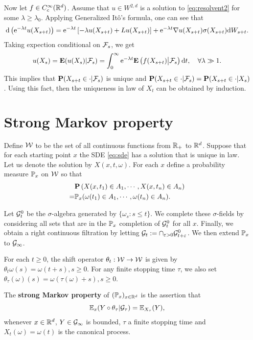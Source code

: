 	Now let $f\in C_c^\infty({\mathbb R}^d)$. Assume that $u\in W^{2,d}$ is a solution to \eqref{eq:resolvent2} for some $\lambda\geq \lambda_0$.  Applying Generalized It\^o's formula, one can see that 
	\begin{align*}
		\text{\rm{d}} \left(\mathrm{e}^{-\lambda t} u(X_{s+t}) \right)=  \mathrm{e}^{-\lambda t} \left[-\lambda u(X_{s+t}) + Lu(X_{s+t})\right] + \mathrm{e}^{-\lambda t} \nabla u(X_{s+t}) \sigma (X_{s+t})\text{\rm{d}} W_{s+t}. 
	\end{align*}
	Taking expection conditional on ${\mathcal F}_s$, we get 
	\[
	    u(X_s) ={\mathbf E}(u(X_s)| {\mathcal F}_s)=  \int_0^\infty \mathrm{e}^{-\lambda t}{\mathbf E} \left(  f(X_{s+t})   \big | {\mathcal F}_s \right) \text{\rm{d}} t,\quad \forall \lambda \gg 1. 
	\]
    This implies that ${\mathbf P} (X_{s+t}\in \cdot| {\mathcal F}_s)$ is unique and ${\mathbf P} (X_{s+t}\in \cdot| {\mathcal F}_s)={\mathbf P} (X_{s+t}\in \cdot| X_s)$. Using this fact, then the uniqueness in law of $X_t$ can be obtained by induction. 

\section{Strong Markov property}
Define ${\mathcal W}$ to be the set of all continuous functions from ${\mathbb R}_+$ to ${\mathbb R}^d$. Suppose that for each starting point $x$ the SDE \eqref{eq:sde} has a solution that is unique in law. Let us denote the solution by $X(x, t, \omega)$. For each $x$ define a probability measure ${\mathbb P}_x$ on ${\mathcal W}$ so that
	\begin{align*}
		&{\mathbf P} \left(X(x, t_1)\in A_1,\cdots, X(x, t_n)\in A_n\right)\\
		=&{\mathbb P}_x(\omega({t_1})\in A_1,\cdots, \omega({t_n})\in A_n). 
	\end{align*}

Let ${\mathcal G}^0_t$ be the $\sigma$-algebra generated by $\{\omega_s: s\leq t\}$. We complete these $\sigma$-fields by considering all sets that are in the ${\mathbb P}_x$ completion of ${\mathcal G}^0_t$ for all $x$. Finally, we obtain a right continuous filtration by letting ${\mathcal G}_t:=\cap_{\varepsilon>0} {\mathcal G}_{t+\varepsilon}^0$. We then extend ${\mathbb P}_x$ to ${\mathcal G}_\infty$.

For each \(t\geq 0\), the shift operator $\theta_t:{\mathcal W}\to {\mathcal W}$ is given by $\theta_t\omega (s)= \omega(t+s), s\geq 0$. For any finite stopping time \(\tau\), we also set \(\theta_\tau (\omega)(s)=\omega(\tau(\omega)+s), s\geq 0\). 
    
The {\bf strong Markov property} of \(({\mathbb P}_x)_{x\in{\mathbb R}^d}\) is the assertion that 
\[
    {\mathbb E}_x(Y\circ\theta_{\tau}|{\mathcal G}_\tau) = {\mathbb E}_{X_\tau}(Y), 
\]
whenever $x\in {\mathbb R}^d$, $Y\in {\mathcal G}_\infty$ is bounded, $\tau$ a finite stopping time and \(X_t(\omega)=\omega(t)\) is the canonical process. 

